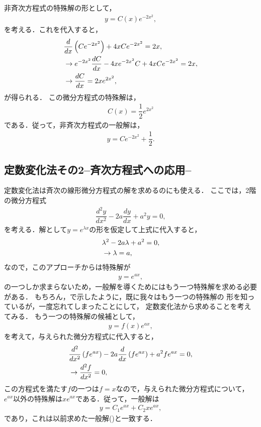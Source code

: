 非斉次方程式の特殊解の形として，
\begin{align}
 y = C(x)e^{-2x^2}, 
\end{align}
を考える．これを代入すると，
\begin{align}
 & \dfrac{d}{dx}\left(Ce^{-2x^2}\right) + 4xCe^{-2x^2} = 2x, \notag \\
 & \rightarrow e^{-2x^2}\dfrac{dC}{dx}-4xe^{-2x^2}C + 4xCe^{-2x^2}= 2x, \notag \\
 & \rightarrow \dfrac{dC}{dx} = 2xe^{2x^2},
\end{align}
が得られる．
この微分方程式の特殊解は，
\begin{align}
  C(x) = \dfrac{1}{2}e^{2x^2} 
\end{align}
である．従って，非斉次方程式の一般解は，
\begin{align}
  y = Ce^{-2x^2} + \dfrac{1}{2}. 
\end{align}
%
\newpage
%
\subsection{定数変化法その2–斉次方程式への応用–}
%
定数変化法は斉次の線形微分方程式の解を求めるのにも使える．
ここでは，2階の微分方程式
\begin{align}
 \dfrac{d^2 y}{dx^2} - 2a\dfrac{dy}{dx} + a^2 y= 0, 
\end{align}
を考える．解として$y=e^{\lambda x}$の形を仮定して上式に代入すると，
\begin{align}
  &\lambda^2 - 2a \lambda + a^2 = 0,\notag \\
  &\rightarrow \lambda = a, \notag 
\end{align}
なので，このアプローチからは特殊解が
\begin{align}
  y = e^{ax}, 
\end{align}
の一つしか求まらないため，一般解を導くためにはもう一つ特殊解を求める必要がある．
もちろん，で示したように，既に我々はもう一つの特殊解の
形を知っているが，一度忘れてしまったことにして，
定数変化法から求めることを考えてみる．
もう一つの特殊解の候補として，
\begin{align}
  y = f(x) e^{ax}, 
\end{align}
を考えて，与えられた微分方程式に代入すると，
\begin{align}
  &\dfrac{d^2}{dx^2}\left(fe^{ax}\right) - 2a\dfrac{d}{dx}\left(fe^{ax}\right) + a^2 fe^{ax}=0, \notag \\
  &\rightarrow \dfrac{d^2 f}{dx^2} = 0, 
\end{align}
この方程式を満たす$f$の一つは$f=x$なので，与えられた微分方程式について，
$e^{ax}$以外の特殊解は$xe^{ax}$である．従って，一般解は
\begin{align}
 y = C_1 e^{ax} + C_2 xe^{ax},
\end{align}
であり，これは以前求めた一般解()と一致する．

